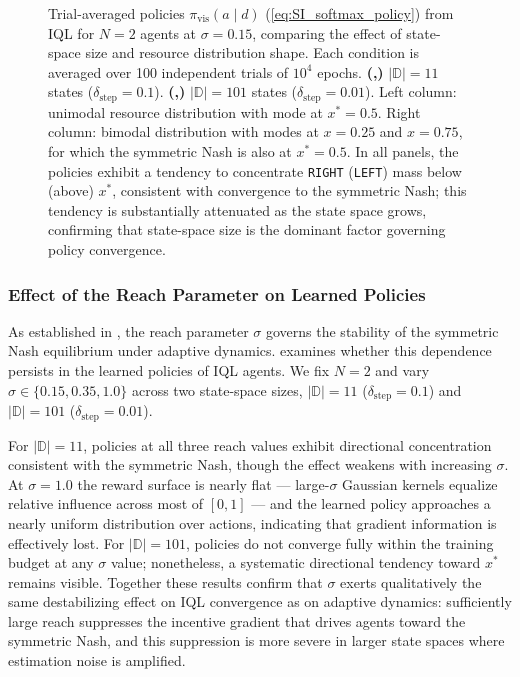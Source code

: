 \documentclass{article}
\begin{document}
\begin{figure}[ht!]
                        
                        \caption{Trial-averaged policies $\pi_{\mathrm{vis}}(a\mid d)$ (\cref{eq:SI_softmax_policy}) from IQL for $N=2$ agents at $\sigma=0.15$, comparing the effect of state-space size and resource distribution shape. Each condition is averaged over 100 independent trials of $10^4$ epochs. \textbf{(,)} $|\mathbb{D}|=11$ states ($\delta_{\mathrm{step}}=0.1$). \textbf{(,)} $|\mathbb{D}|=101$ states ($\delta_{\mathrm{step}}=0.01$). Left column: unimodal resource distribution with mode at $x^*=0.5$. Right column: bimodal distribution with modes at $x=0.25$ and $x=0.75$, for which the symmetric Nash is also at $x^*=0.5$. In all panels, the policies exhibit a tendency to concentrate \texttt{RIGHT} (\texttt{LEFT}) mass below (above) $x^*$, consistent with convergence to the symmetric Nash; this tendency is substantially attenuated as the state space grows, confirming that state-space size is the dominant factor governing policy convergence.}
                        \label{fig:qlearn_states} 
                \end{figure}
            \clearpage
            \subsubsection{Effect of the Reach Parameter on Learned Policies}
                As established in , the reach parameter $\sigma$ governs the stability of the symmetric Nash equilibrium under adaptive dynamics.  examines whether this dependence persists in the learned policies of IQL agents. We fix $N=2$ and vary $\sigma \in \{0.15, 0.35, 1.0\}$ across two state-space sizes, $|\mathbb{D}|=11$ ($\delta_{\mathrm{step}}=0.1$) and $|\mathbb{D}|=101$ ($\delta_{\mathrm{step}}=0.01$).

                For $|\mathbb{D}| = 11$, policies at all three reach values exhibit directional concentration consistent with the symmetric Nash, though the effect weakens with increasing $\sigma$. At $\sigma = 1.0$ the reward surface is nearly flat --- large-$\sigma$ Gaussian kernels equalize relative influence across most of $[0,1]$ --- and the learned policy approaches a nearly uniform distribution over actions, indicating that gradient information is effectively lost. For $|\mathbb{D}| = 101$, policies do not converge fully within the training budget at any $\sigma$ value; nonetheless, a systematic directional tendency toward $x^*$ remains visible. Together these results confirm that $\sigma$ exerts qualitatively the same destabilizing effect on IQL convergence as on adaptive dynamics: sufficiently large reach suppresses the incentive gradient that drives agents toward the symmetric Nash, and this suppression is more severe in larger state spaces where estimation noise is amplified.
            
\end{document}
